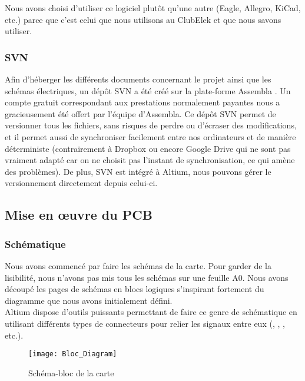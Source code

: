 Nous avons choisi d'utiliser ce logiciel plutôt qu'une autre (Eagle, Allegro, KiCad, etc.) parce que c'est celui que nous utilisons au ClubElek et que nous savons utiliser.
            
\subsubsection{SVN}
Afin d'héberger les différents documents concernant le projet ainsi que les schémas électriques, un dépôt SVN a été créé sur la plate-forme Assembla \autocite{Assembla}.
Un compte gratuit correspondant aux prestations normalement payantes nous a gracieusement été offert par l'équipe d'Assembla.
Ce dépôt SVN permet de versionner tous les fichiers, sans risques de perdre ou d'écraser des modifications, et il permet aussi de synchroniser facilement entre nos ordinateurs et de manière déterministe (contrairement à Dropbox ou encore Google Drive qui ne sont pas vraiment adapté car on ne choisit pas l'instant de synchronisation, ce qui amène des problèmes).
De plus, SVN est intégré à Altium, nous pouvons gérer le versionnement directement depuis celui-ci.
	
\subsection{Mise en œuvre du PCB}
\subsubsection{Schématique}
Nous avons commencé par faire les schémas de la carte.
Pour garder de la lisibilité, nous n'avons pas mis tous les schémas sur une feuille A0.
Nous avons découpé les pages de schémas en blocs logiques s'inspirant fortement du diagramme que nous avons initialement défini. \\
Altium dispose d'outils puissants permettant de faire ce genre de schématique en utilisant différents types de connecteurs pour relier les signaux entre eux \autocite{AltiumMultiSheet} (, , , etc.).
        
\begin{figure}[H]
	\begin{center}
		\texttt{[image: Bloc\_Diagram]}
	\end{center}
	\caption{Schéma-bloc de la carte}
\end{figure}
        
